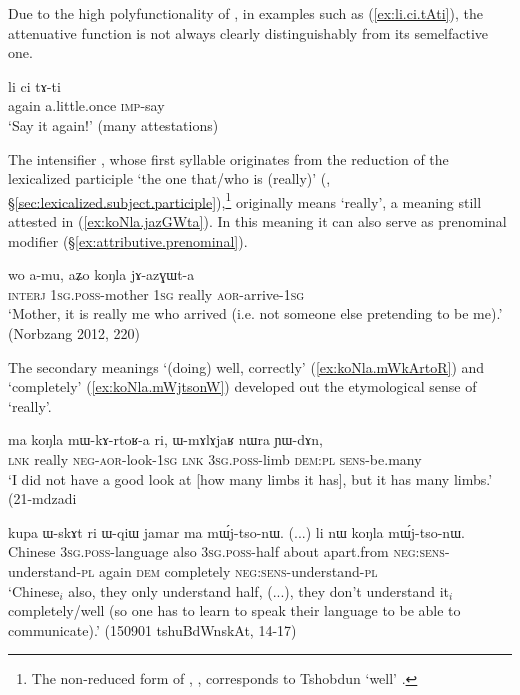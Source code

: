  Due to the high polyfunctionality of , in examples such as  (\ref{ex:li.ci.tAti}), the attenuative function is not always clearly distinguishably from its semelfactive one. 
 
 \begin{exe}
\ex \label{ex:li.ci.tAti}
\gll li ci tɤ-ti \\
again a.little.once \textsc{imp}-say \\
\glt `Say it again!' (many attestations)
 \end{exe} 
  
The intensifier , whose first syllable originates from the reduction of the lexicalized participle  `the one that/who is (really)' (, §\ref{sec:lexicalized.subject.participle}),\footnote{The non-reduced form of , , corresponds to Tshobdun  `well' \citep[55]{jackson19tshobdun}. } originally means `really', a meaning still attested in (\ref{ex:koNla.jazGWta}). In this meaning it can also serve as prenominal modifier (§\ref{ex:attributive.prenominal}).

 \begin{exe}
\ex \label{ex:koNla.jazGWta}
\gll   wo a-mu, aʑo koŋla jɤ-azɣɯt-a \\
\textsc{interj} \textsc{1sg}.\textsc{poss}-mother \textsc{1sg} really \textsc{aor}-arrive-\textsc{1sg} \\
\glt `Mother, it is really me who arrived (i.e. not someone else pretending to be me).' (Norbzang 2012, 220)
 \end{exe} 
 
The secondary meanings `(doing) well, correctly' (\ref{ex:koNla.mWkArtoR}) and `completely' (\ref {ex:koNla.mWjtsonW})  developed out the etymological sense of `really'.
 
 \begin{exe}
\ex \label{ex:koNla.mWkArtoR}
\gll ma koŋla mɯ-kɤ-rtoʁ-a ri, ɯ-mɤlɤjaʁ nɯra ɲɯ-dɤn, \\
\textsc{lnk} really \textsc{neg}-\textsc{aor}-look-\textsc{1sg} \textsc{lnk} \textsc{3sg}.\textsc{poss}-limb \textsc{dem}:\textsc{pl} \textsc{sens}-be.many \\
\glt `I did not have a good look at [how many limbs it has], but it has many limbs.' (21-mdzadi
 \end{exe} 
 
 
\begin{exe}
\ex \label{ex:koNla.mWjtsonW}
\gll kupa ɯ-skɤt ri ɯ-qiɯ jamar ma mɯ́j-tso-nɯ. (...) li nɯ koŋla mɯ́j-tso-nɯ. \\
Chinese \textsc{3sg}.\textsc{poss}-language also \textsc{3sg}.\textsc{poss}-half about apart.from \textsc{neg}:\textsc{sens}-understand-\textsc{pl} {  } again \textsc{dem} completely \textsc{neg}:\textsc{sens}-understand-\textsc{pl} \\
\glt `Chinese$_i$  also, they only understand half, (...), they don't understand it$_i$ completely/well (so one has to learn to speak their language to be able to communicate).' (150901 tshuBdWnskAt, 14-17)
\end{exe} 

